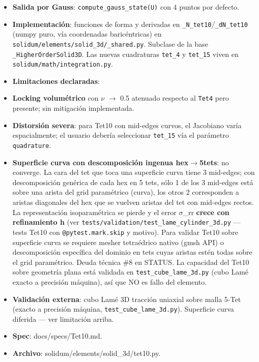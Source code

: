 \documentclass[11pt,letterpaper,oneside]{report}
\begin{document}
\begin{itemize}
  \item \textbf{Salida por Gauss}: \texttt{compute\_gauss\_state(U)} con 4 puntos por defecto.
  \item \textbf{Implementación}: funciones de forma y derivadas en \texttt{\_N\_tet10}/\texttt{\_dN\_tet10} (numpy puro, vía coordenadas baricéntricas) en \texttt{solidum/elements/solid\_3d/\_shared.py}. Subclase de la base \texttt{\_HigherOrderSolid3D}. Las nuevas cuadraturas \texttt{tet\_4} y \texttt{tet\_15} viven en \texttt{solidum/math/integration.py}.
  \item \textbf{Limitaciones declaradas}:
  \item \textbf{Locking volumétrico} con \ensuremath{\nu} \ensuremath{\to} 0.5 atenuado respecto al \texttt{Tet4} pero presente; sin mitigación implementada.
  \item \textbf{Distorsión severa}: para Tet10 con mid-edges curvos, el Jacobiano varía espacialmente; el usuario debería seleccionar \texttt{tet\_15} vía el parámetro \texttt{quadrature}.
  \item \textbf{Superficie curva con descomposición ingenua hex\ensuremath{\to}5tets}: no converge. La cara del tet que toca una superficie curva tiene 3 mid-edges; con descomposición genérica de cada hex en 5 tets, sólo 1 de los 3 mid-edges está sobre una arista del grid paramétrico (curva), los otros 2 corresponden a aristas diagonales del hex que se vuelven aristas del tet con mid-edges rectos. La representación isoparamétrica se pierde y el error \ensuremath{\sigma}\_rr \textbf{crece con refinamiento h} (ver \texttt{tests/validation/test\_lame\_cylinder\_3d.py} --- tests Tet10 con \texttt{@pytest.mark.skip} y motivo). Para validar Tet10 sobre superficie curva se requiere mesher tetraédrico nativo (gmsh API) o descomposición específica del dominio en tets cuyas aristas estén todas sobre el grid paramétrico. Deuda técnica \#8 en STATUS. La capacidad del Tet10 sobre geometría plana está validada en \texttt{test\_cube\_lame\_3d.py} (cubo Lamé exacto a precisión máquina), así que NO es fallo del elemento.
  \item \textbf{Validación externa}: cubo Lamé 3D tracción uniaxial sobre malla 5-Tet (exacto a precisión máquina, \texttt{test\_cube\_lame\_3d.py}). Superficie curva diferida --- ver limitación arriba.
  \item \textbf{Spec}: docs/specs/Tet10.md.
  \item \textbf{Archivo}: solidum/elements/solid\_3d/tet10.py.
\end{itemize}
\end{document}
